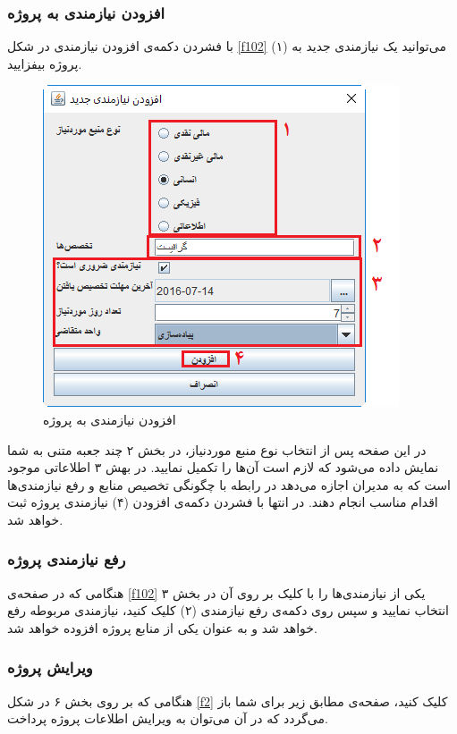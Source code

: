 \subsubsection{افزودن نیازمندی به پروژه}
با فشردن دکمه‌ی افزودن نیازمندی  در شکل 
\ref{f102}
(۱) می‌توانید یک نیازمندی جدید به پروژه بیفزایید.

\begin{figure}[H]
	\centering
	\includegraphics[scale=0.7]{img/manual/addReqToPrj}
	\caption{افزودن نیازمندی به پروژه}
	\label{f5}
\end{figure}

در این صفحه پس از انتخاب نوع منبع موردنیاز، در بخش ۲ چند جعبه متنی به شما نمایش داده می‌شود که لازم است آن‌ها را تکمیل نمایید. در بهش ۳ اطلاعاتی موجود است که به مدیران اجازه می‌دهد در رابطه با چگونگی تخصیص منابع و رفع نیازمندی‌ها اقدام مناسب انجام دهند. در انتها با فشردن دکمه‌ی افزودن (۴) نیازمندی پروژه ثبت خواهد شد.

\subsubsection{رفع نیازمندی پروژه}
هنگامی که در صفحه‌ی 
\ref{f102}
یکی از نیازمندی‌ها را با کلیک بر روی آن در بخش ۳ انتخاب نمایید و سپس روی دکمه‌ی رفع نیازمندی (۲) کلیک کنید، نیازمندی مربوطه رفع خواهد شد و به عنوان یکی از منابع پروژه افزوده خواهد شد.


\subsubsection{ویرایش پروژه}
هنگامی که بر روی بخش ۶ در شکل
\ref{f2}
کلیک کنید، صفحه‌ی مطابق زیر برای شما باز می‌گردد که در آن می‌توان  به ویرایش اطلاعات پروژه پرداخت.

